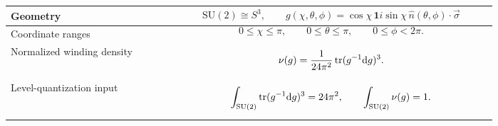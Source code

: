 \begingroup
\small
\providecommand{\SU}{\mathrm{SU}}
\renewcommand{\arraystretch}{1.35}
\begin{center}
\begin{tabular}{@{}p{0.28\linewidth}p{0.55\linewidth}@{}}
\hline
Geometry &
\[
\SU(2)\cong S^3,\qquad
g(\chi,\theta,\phi)
=\cos\chi\,\mathbf{1}
i\sin\chi\,\hat n(\theta,\phi)\cdot\vec\sigma
\]
\\
\hline
Coordinate ranges &
\[
0\leq\chi\leq\pi,\qquad
0\leq\theta\leq\pi,\qquad
0\leq\phi<2\pi .
\]
\\
\hline
Normalized winding density &
\[
\nu(g)=
\frac{1}{24\pi^2}\operatorname{tr}(g^{-1}\dd g)^3 .
\]
\\
\hline
Level-quantization input &
\[
\int_{\SU(2)}\tr(g^{-1}\dd g)^3=24\pi^2,
\qquad
\int_{\SU(2)}\nu(g)=1 .
\]
\\
\hline
\end{tabular}

\vspace{0.8em}
\end{center}
\endgroup
